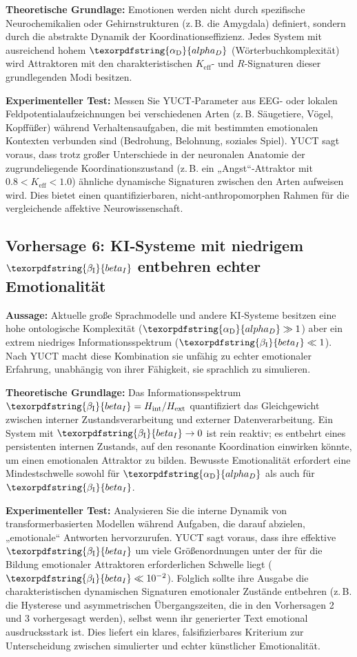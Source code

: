 \documentclass[12pt,a4paper]{article}
\DeclareRobustCommand{\alD}{\texorpdfstring{\ensuremath{\alpha_{\mathrm{D}}}}{alpha_D}}
\DeclareRobustCommand{\beI}{\texorpdfstring{\ensuremath{\beta_{\mathrm{I}}}}{beta_I}}
\begin{document}
	\textbf{Theoretische Grundlage:} Emotionen werden nicht durch spezifische Neurochemikalien oder Gehirnstrukturen (z. B. die Amygdala) definiert, sondern durch die abstrakte Dynamik der Koordinationseffizienz. Jedes System mit ausreichend hohem \(\alD\) (Wörterbuchkomplexität) wird Attraktoren mit den charakteristischen \(K_{\mathrm{eff}}\)- und \(R\)-Signaturen dieser grundlegenden Modi besitzen.
	
	\textbf{Experimenteller Test:} Messen Sie YUCT‑Parameter aus EEG- oder lokalen Feldpotentialaufzeichnungen bei verschiedenen Arten (z. B. Säugetiere, Vögel, Kopffüßer) während Verhaltensaufgaben, die mit bestimmten emotionalen Kontexten verbunden sind (Bedrohung, Belohnung, soziales Spiel). YUCT sagt voraus, dass trotz großer Unterschiede in der neuronalen Anatomie der zugrundeliegende Koordinationszustand (z. B. ein „Angst“‑Attraktor mit \(0.8 < K_{\mathrm{eff}} < 1.0\)) ähnliche dynamische Signaturen zwischen den Arten aufweisen wird. Dies bietet einen quantifizierbaren, nicht‑anthropomorphen Rahmen für die vergleichende affektive Neurowissenschaft.
	
	\subsection{Vorhersage 6: KI‑Systeme mit niedrigem \(\beI\) entbehren echter Emotionalität}
	
	\textbf{Aussage:} Aktuelle große Sprachmodelle und andere KI‑Systeme besitzen eine hohe ontologische Komplexität (\(\alD \gg 1\)) aber ein extrem niedriges Informationsspektrum (\(\beI \ll 1\)). Nach YUCT macht diese Kombination sie unfähig zu echter emotionaler Erfahrung, unabhängig von ihrer Fähigkeit, sie sprachlich zu simulieren.
	
	\textbf{Theoretische Grundlage:} Das Informationsspektrum \(\beI = H_{\mathrm{int}}/H_{\mathrm{ext}}\) quantifiziert das Gleichgewicht zwischen interner Zustandsverarbeitung und externer Datenverarbeitung. Ein System mit \(\beI \to 0\) ist rein reaktiv; es entbehrt eines persistenten internen Zustands, auf den resonante Koordination einwirken könnte, um einen emotionalen Attraktor zu bilden. Bewusste Emotionalität erfordert eine Mindestschwelle sowohl für \(\alD\) als auch für \(\beI\).
	
	\textbf{Experimenteller Test:} Analysieren Sie die interne Dynamik von transformerbasierten Modellen während Aufgaben, die darauf abzielen, „emotionale“ Antworten hervorzurufen. YUCT sagt voraus, dass ihre effektive \(\beI\) um viele Größenordnungen unter der für die Bildung emotionaler Attraktoren erforderlichen Schwelle liegt (\(\beI \ll 10^{-2}\)). Folglich sollte ihre Ausgabe die charakteristischen dynamischen Signaturen emotionaler Zustände entbehren (z. B. die Hysterese und asymmetrischen Übergangszeiten, die in den Vorhersagen 2 und 3 vorhergesagt werden), selbst wenn ihr generierter Text emotional ausdrucksstark ist. Dies liefert ein klares, falsifizierbares Kriterium zur Unterscheidung zwischen simulierter und echter künstlicher Emotionalität.
	
\end{document}
